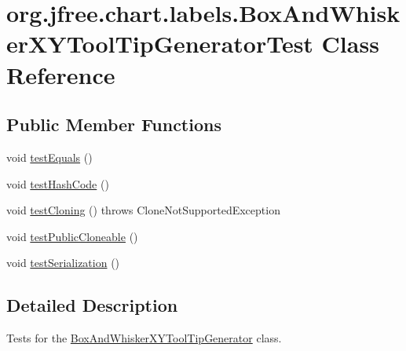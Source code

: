 \hypertarget{classorg_1_1jfree_1_1chart_1_1labels_1_1_box_and_whisker_x_y_tool_tip_generator_test}{}\section{org.\+jfree.\+chart.\+labels.\+Box\+And\+Whisker\+X\+Y\+Tool\+Tip\+Generator\+Test Class Reference}
\label{classorg_1_1jfree_1_1chart_1_1labels_1_1_box_and_whisker_x_y_tool_tip_generator_test}
\subsection*{Public Member Functions}
\begin{DoxyCompactItemize}
\item 
void \mbox{\hyperlink{classorg_1_1jfree_1_1chart_1_1labels_1_1_box_and_whisker_x_y_tool_tip_generator_test_a2276c0e7a8fd58ffa1d6e204592e9268}{test\+Equals}} ()
\item 
void \mbox{\hyperlink{classorg_1_1jfree_1_1chart_1_1labels_1_1_box_and_whisker_x_y_tool_tip_generator_test_a49d23042bb412d2c3190b8d4c07ee3cd}{test\+Hash\+Code}} ()
\item 
void \mbox{\hyperlink{classorg_1_1jfree_1_1chart_1_1labels_1_1_box_and_whisker_x_y_tool_tip_generator_test_a72588d0f1316811affdee37ce2aab1c2}{test\+Cloning}} ()  throws Clone\+Not\+Supported\+Exception 
\item 
void \mbox{\hyperlink{classorg_1_1jfree_1_1chart_1_1labels_1_1_box_and_whisker_x_y_tool_tip_generator_test_a3ef789a652b2795b564dc3974beba963}{test\+Public\+Cloneable}} ()
\item 
void \mbox{\hyperlink{classorg_1_1jfree_1_1chart_1_1labels_1_1_box_and_whisker_x_y_tool_tip_generator_test_ac9b7a90d21b3f06c46265a7c8dcbcfa7}{test\+Serialization}} ()
\end{DoxyCompactItemize}


\subsection{Detailed Description}
Tests for the \mbox{\hyperlink{classorg_1_1jfree_1_1chart_1_1labels_1_1_box_and_whisker_x_y_tool_tip_generator}{Box\+And\+Whisker\+X\+Y\+Tool\+Tip\+Generator}} class. 

